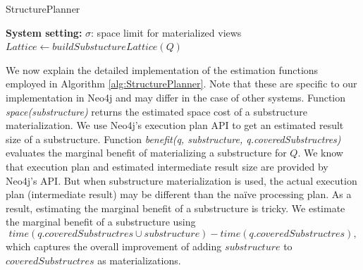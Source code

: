 \begin{algorithm}%
\label{alg:StructurePlanner}
\caption{StructurePlanner}
\LinesNumbered
\textbf{System setting:} $\sigma$: space limit for materialized views\\
$Lattice \leftarrow buildSubstuctureLattice(Q)$\;
\end{algorithm}

We now explain the detailed implementation of the estimation functions employed in Algorithm \ref{alg:StructurePlanner}. Note that these are specific to our implementation in Neo4j and may differ in the case of other systems. Function \textit{space(substructure)} returns the estimated space cost of a substructure materialization. We use Neo4j's execution plan API to get an estimated result size of a substructure. Function \textit{benefit(q, substructure, q.coveredSubstructres)} evaluates the marginal benefit of materializing a substructure for $Q$. We know that execution plan and estimated intermediate result size are provided by Neo4j's API. But when substructure materialization is used, the actual execution plan (intermediate result) may be different than the na\"ive processing plan. As a result, estimating the marginal benefit of a substructure is tricky. We estimate the marginal benefit of a substructure using
\begin{displaymath}
time(q.coveredSubstructres \cup substructure) - time(q.coveredSubstructres),
\end{displaymath}
\noindent which captures the overall improvement of adding $substructure$ to $coveredSubstructres$ as materializations.


